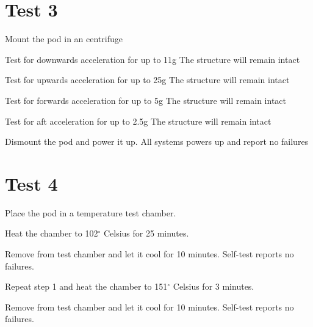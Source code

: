 \documentclass[Main]{subfiles}
\begin{document}
\newpage
\section{Test 3}


\begin{TestCaseIntro}
\end{TestCaseIntro}

\begin{TestCase}
\TC
{Mount the pod in an centrifuge}
{}

\TC
{Test for downwards acceleration for up to 11g}
{The structure will remain intact}

\TC
{Test for upwards acceleration for up to 25g}
{The structure will remain intact}

\TC
{Test for forwards acceleration for up to 5g}
{The structure will remain intact}

\TC
{Test for aft acceleration for up to 2.5g}
{The structure will remain intact}

\TC
{Dismount the pod and power it up.}
{All systems powers up and report no failures}

\end{TestCase}


\newpage
\section{Test 4}


\begin{TestCaseIntro}
\end{TestCaseIntro}

\begin{TestCase}
\TC
{Place the pod in a temperature test chamber.}
{}


\TC
{Heat the chamber to 102$^\circ$ Celsius for 25 minutes.}
{}


\TC
{Remove from test chamber and let it cool for 10 minutes.}
{Self-test reports no failures.}

\TC
{Repeat step 1 and heat the chamber to 151$^\circ$ Celsius for 3 minutes.} 
{}

\TC
{Remove from test chamber and let it cool for 10 minutes.}
{Self-test reports no failures.}

\\
\end{TestCase}
\end{document}
